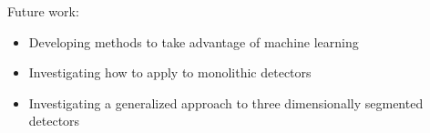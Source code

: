 

\fbox
{
\begin{minipage}{0.98\textwidth}
\vspace{0.5cm}
    Future work:
        \begin{itemize}
            \item Developing methods to take advantage of machine learning
            \item Investigating how to apply to monolithic detectors
            \item Investigating a generalized approach to three dimensionally segmented detectors
        \end{itemize}
\end{minipage}
}
